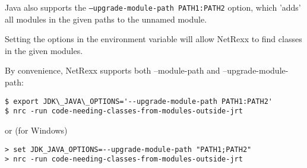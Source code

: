 Java also supports the \texttt{--upgrade-module-path PATH1:PATH2} option, which 'adds' all modules in the given paths to the unnamed module.

Setting the options in the  environment variable will allow NetRexx to find classes in the given modules.

By convenience, NetRexx supports both --module-path and --upgrade-module-path:

\begin{verbatim}
$ export JDK\_JAVA\_OPTIONS='--upgrade-module-path PATH1:PATH2'
$ nrc -run code-needing-classes-from-modules-outside-jrt
\end{verbatim}
or (for Windows)
\begin{verbatim}
> set JDK_JAVA_OPTIONS=--upgrade-module-path "PATH1;PATH2"
> nrc -run code-needing-classes-from-modules-outside-jrt
\end{verbatim}
